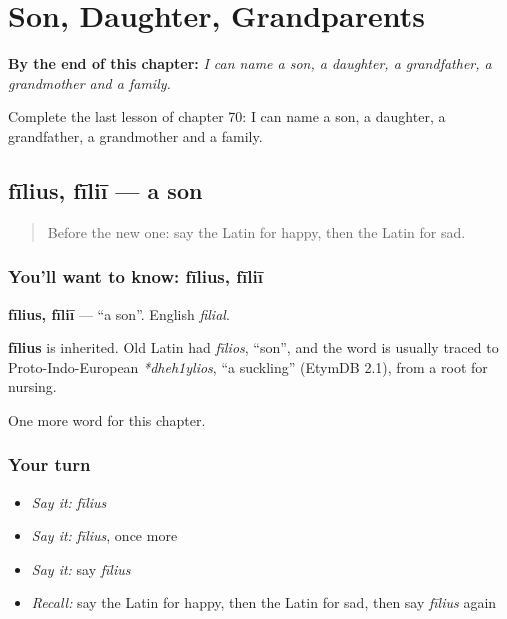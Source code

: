 
\chapter{Son, Daughter, Grandparents}
\label{ch:la-son-daughter-grandparents}

\begin{chapteropening}
\textbf{By the end of this chapter:} \emph{I can name a son, a daughter, a grandfather, a grandmother and a family.}

Complete the last lesson of chapter 70: I can name a son, a daughter, a grandfather, a grandmother and a family.
\end{chapteropening}

\section[fīlius, fīliī]{fīlius, fīliī — a son}

\label{lesson:LA-C70-filius}



\begin{quote}
Before the new one: say the Latin for happy, then the Latin for sad.
\end{quote}

\subsection*{You'll want to know: fīlius, fīliī}
\textbf{fīlius, fīliī} — \textquotedblleft{}a son\textquotedblright{}. English \emph{filial}.

\begin{cousinweb}
\textbf{fīlius} is inherited. Old Latin had \emph{fīlios}, \textquotedblleft{}son\textquotedblright{}, and the word is usually traced to Proto-Indo-European \emph{*dheh1ylios}, \textquotedblleft{}a suckling\textquotedblright{} (EtymDB 2.1), from a root for nursing.
\end{cousinweb}

\begin{grammarlens}[title={What you've built}]
One more word for this chapter.
\end{grammarlens}

\subsection*{Your turn}
\begin{itemize}
\raggedright
  \item \emph{Say it:} \emph{fīlius}
  \item \emph{Say it:} \emph{fīlius}, once more
  \item \emph{Say it:} say \emph{fīlius}
  \item \emph{Recall:} say the Latin for happy, then the Latin for sad, then say \emph{fīlius} again
\end{itemize}

